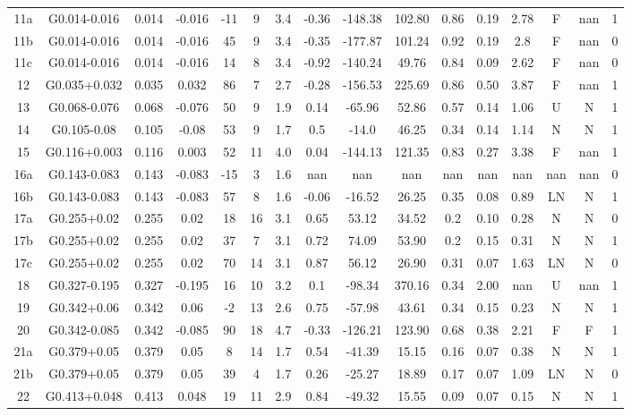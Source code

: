 \begin{table}
\begin{tabular}{cccccccccccccccc}
11a & G0.014-0.016 & 0.014 & -0.016 & -11 & 9 & 3.4 & -0.36 & -148.38 & 102.80 & 0.86 & 0.19 & 2.78 & F & nan & 1 \\
11b & G0.014-0.016 & 0.014 & -0.016 & 45 & 9 & 3.4 & -0.35 & -177.87 & 101.24 & 0.92 & 0.19 & 2.8 & F & nan & 0 \\
11c & G0.014-0.016 & 0.014 & -0.016 & 14 & 8 & 3.4 & -0.92 & -140.24 & 49.76 & 0.84 & 0.09 & 2.62 & F & nan & 0 \\
12 & G0.035+0.032 & 0.035 & 0.032 & 86 & 7 & 2.7 & -0.28 & -156.53 & 225.69 & 0.86 & 0.50 & 3.87 & F & nan & 1 \\
13 & G0.068-0.076 & 0.068 & -0.076 & 50 & 9 & 1.9 & 0.14 & -65.96 & 52.86 & 0.57 & 0.14 & 1.06 & U & N & 1 \\
14 & G0.105-0.08 & 0.105 & -0.08 & 53 & 9 & 1.7 & 0.5 & -14.0 & 46.25 & 0.34 & 0.14 & 1.14 & N & N & 1 \\
15 & G0.116+0.003 & 0.116 & 0.003 & 52 & 11 & 4.0 & 0.04 & -144.13 & 121.35 & 0.83 & 0.27 & 3.38 & F & nan & 1 \\
16a & G0.143-0.083 & 0.143 & -0.083 & -15 & 3 & 1.6 & nan & nan & nan & nan & nan & nan & nan & nan & 0 \\
16b & G0.143-0.083 & 0.143 & -0.083 & 57 & 8 & 1.6 & -0.06 & -16.52 & 26.25 & 0.35 & 0.08 & 0.89 & LN & N & 1 \\
17a & G0.255+0.02 & 0.255 & 0.02 & 18 & 16 & 3.1 & 0.65 & 53.12 & 34.52 & 0.2 & 0.10 & 0.28 & N & N & 0 \\
17b & G0.255+0.02 & 0.255 & 0.02 & 37 & 7 & 3.1 & 0.72 & 74.09 & 53.90 & 0.2 & 0.15 & 0.31 & N & N & 1 \\
17c & G0.255+0.02 & 0.255 & 0.02 & 70 & 14 & 3.1 & 0.87 & 56.12 & 26.90 & 0.31 & 0.07 & 1.63 & LN & N & 0 \\
18 & G0.327-0.195 & 0.327 & -0.195 & 16 & 10 & 3.2 & 0.1 & -98.34 & 370.16 & 0.34 & 2.00 & nan & U & nan & 1 \\
19 & G0.342+0.06 & 0.342 & 0.06 & -2 & 13 & 2.6 & 0.75 & -57.98 & 43.61 & 0.34 & 0.15 & 0.23 & N & N & 1 \\
20 & G0.342-0.085 & 0.342 & -0.085 & 90 & 18 & 4.7 & -0.33 & -126.21 & 123.90 & 0.68 & 0.38 & 2.21 & F & F & 1 \\
21a & G0.379+0.05 & 0.379 & 0.05 & 8 & 14 & 1.7 & 0.54 & -41.39 & 15.15 & 0.16 & 0.07 & 0.38 & N & N & 1 \\
21b & G0.379+0.05 & 0.379 & 0.05 & 39 & 4 & 1.7 & 0.26 & -25.27 & 18.89 & 0.17 & 0.07 & 1.09 & LN & N & 0 \\
22 & G0.413+0.048 & 0.413 & 0.048 & 19 & 11 & 2.9 & 0.84 & -49.32 & 15.55 & 0.09 & 0.07 & 0.15 & N & N & 1 \\

\end{tabular}
\end{table}
